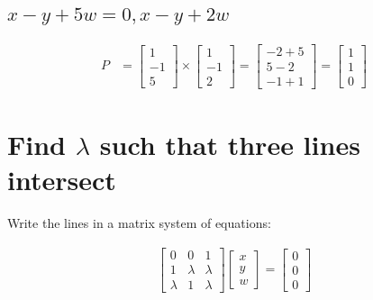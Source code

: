 \documentclass[12pt, oneside]{article}
\begin{document}
\subsection{$x-y+5w=0, x-y+2w$}
  \begin{align*}
    P &= \begin{bmatrix}
           1 \\
           -1 \\
           5
         \end{bmatrix} \times 
          \begin{bmatrix}
                    1 \\
                    -1 \\
                    2
                  \end{bmatrix}  
= 
 \begin{bmatrix}
                    -2+5 \\
                    5-2\\
                    -1+1
                  \end{bmatrix}                   
= 
 \begin{bmatrix}
                    1 \\
                    1 \\
                    0 
                  \end{bmatrix}                                                   
  \end{align*}
  
\section{Find $\lambda$ such that three lines intersect}  

Write the lines in a matrix system of equations:

\begin{align*}
\begin{bmatrix}
0 		& 0 		& 1\\
1 		& \lambda 	& \lambda\\
\lambda & 1 		& \lambda
\end{bmatrix} 
\begin{bmatrix}
x\\
y\\
w
\end{bmatrix} = 
\begin{bmatrix}
0\\
0\\
0
\end{bmatrix}
\end{align*}
\end{document}
